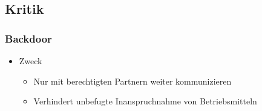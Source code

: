 \documentclass[t, xcolor=dvipsnames]{beamer}
\begin{document}
\subsection{Kritik}
\begin{frame}
	\frametitle{Backdoor}
	\begin{itemize}
		\item Zweck
			\begin{itemize}
				\item Nur mit \alert{berechtigten Partnern} weiter kommunizieren
				\item Verhindert unbefugte Inanspruchnahme von Betriebsmitteln
			\end{itemize}
	\end{itemize}
	\vspace{\fill}
\end{frame}
\end{document}
